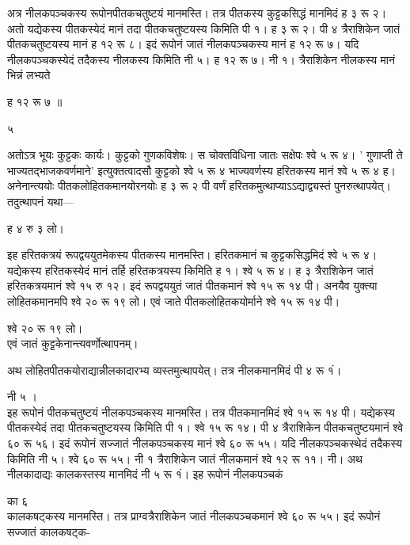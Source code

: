 \documentclass[11pt, openany]{book}
\begin{document}
\begin{sloppypar}
\hangindent=0.2in अत्र नीलकपञ्चकस्य रूपोनपीतकचतुष्टयं मानमस्ति। तत्र पीतकस्य कुट्टकसिद्धं मानमिदं ह ३ रू २। अतो यद्येकस्य पीतकस्येदं मानं तदा पीतकचतुष्टयस्य किमिति पी १। ह ३ रू २। पी ४ त्रैराशिकेन जातं पीतकचतुष्टयस्य मानं ह १२ रू ८। इदं रूपोनं जातं नीलकपञ्चकस्य मानं ह १२ रू ७। यदि नीलकपञ्चकस्येदं तदैकस्य नीलकस्य किमिति नी ५। ह १२ रू ७। नी १। त्रैराशिकेन नीलकस्य मानं भिन्नं लभ्यते

\begin{center}
    ह १२ रू ७ ॥

    \hspace{-0.2in}५
\end{center}

\hangindent=0.2in अतोऽत्र भूयः कुट्टकः कार्यः। कुट्टको गुणकविशेषः। स चोक्तविधिना जातः सक्षेपः श्वे ५ रू ४। ' गुणाप्ती ते भाज्यतद्भाजकवर्णमाने' इत्युक्तत्वादसौ कुट्टको श्वे ५ रू ४ भाज्यवर्णस्य हरितकस्य मानं श्वे ५ रू ४ ह। अनेनान्त्ययोः पीतकलोहितकमानयोरनयोः ह ३ रू २ पी वर्णं हरितकमुत्थाप्याऽऽद्याद्व्यस्तं पुनरुत्थापयेत्। तदुत्थापनं यथा---

ह ४ रु ३ लो।

\hangindent=0.2in इह हरितकत्रयं रूपद्वययुतमेकस्य पीतकस्य मानमस्ति। हरितकमानं च कुट्टकसिद्धमिदं श्वे ५ रू ४। यद्येकस्य हरितकस्येदं मानं तर्हि हरितकत्रयस्य किमिति ह १। श्वे ५ रू ४। ह ३ त्रैराशिकेन जातं हरितकत्रयमानं श्वे १५ रु १२। इदं रूपद्वययुतं जातं पीतकमानं श्वे १५ रू १४ पी। अनयैव युक्त्या लोहितकमानमपि श्वे २० रू १९ लो। एवं जाते पीतकलोहितकयोर्माने श्वे १५ रू १४ पी। 

\hspace{4.6in}श्वे २० रू १९ लो।\\

\hangindent=0.2in एवं जातं कुट्टकेनान्त्यवर्णोत्थापनम्।

\hangindent=0.2in \hspace{0.2in}अथ लोहितपीतकयोराद्यान्नीलकादारभ्य व्यस्तमुत्थापयेत्। तत्र नीलकमानमिदं पी ४ रू १ं।

\hspace{5.25in}नी ५ ।\\

\hangindent=0.2in  इह रूपोनं पीतकचतुष्टयं नीलकपञ्चकस्य मानमस्ति। तत्र पीतकमानमिदं श्वे १५ रू १४ पी। यद्येकस्य पीतकस्येदं तदा पीतकचतुष्टयस्य किमिति पी १। श्वे १५ रू १४। पी ४ त्रैराशिकेन पीतकचतुष्टयमानं श्वे ६० रू ५६। इदं रूपोनं सज्जातं नीलकपञ्चकस्य मानं श्वे ६० रू ५५। यदि नीलकपञ्चकस्थेदं तदैकस्य किमिति नी ५। श्वे ६० रू ५५। नी १ त्रैराशिकेन जातं नीलकमानं श्वे १२ रू ११। नी। अथ नीलकादाद्यः कालकस्तस्य मानमिदं नी ५ रू १ं। इह रूपोनं नीलकपञ्चकं

\hspace{3.9in}का ६\\

\hangindent=0.2in कालकषट्कस्य मानमस्ति। तत्र प्राग्वत्रैराशिकेन जातं नीलकपञ्चकमानं श्वे ६० रू ५५। इदं रूपोनं सज्जातं कालकषट्क-
\end{sloppypar}
\thispagestyle{empty}
\newpage
\end{document}
